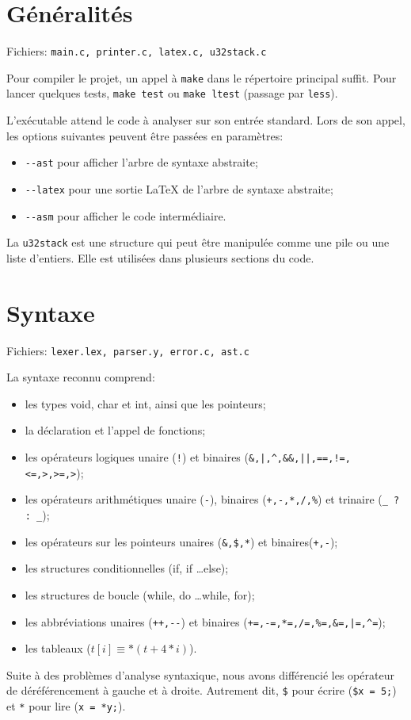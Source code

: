 \documentclass{article}
\begin{document}
	\section{Généralités}
		\par Fichiers: \verb#main.c, printer.c, latex.c, u32stack.c#
		\par Pour compiler le projet, un appel à \verb#make# dans le répertoire principal suffit. Pour lancer quelques tests, \verb#make test# ou \verb#make ltest# (passage par \verb#less#).
		\par L'exécutable attend le code à analyser sur son entrée standard. Lors de son appel, les options suivantes peuvent être passées en paramètres:
		\begin{itemize}
			\item \verb#--ast# pour afficher l'arbre de syntaxe abstraite;
			\item \verb#--latex# pour une sortie LaTeX de l'arbre de syntaxe abstraite;
			\item \verb#--asm# pour afficher le code intermédiaire.
		\end{itemize}
		\par La \verb#u32stack# est une structure qui peut être manipulée comme une pile ou une liste d'entiers. Elle est utilisées dans plusieurs sections du code.
	\section{Syntaxe}
		\par Fichiers: \verb#lexer.lex, parser.y, error.c, ast.c#
		\par La syntaxe reconnu comprend:
		\begin{itemize}
			\item les types void, char et int, ainsi que les pointeurs;
			\item la déclaration et l'appel de fonctions;
			\item les opérateurs logiques unaire (\verb#!#) et binaires (\verb#&,|,^,&&,||,==,!=,<=,>,>=,>#);
			\item les opérateurs arithmétiques unaire (\verb#-#), binaires (\verb#+,-,*,/,%#) et trinaire (\verb#_ ? : _#);
			\item les opérateurs sur les pointeurs unaires (\verb#&,$,*#) et binaires(\verb#+,-#);
			\item les structures conditionnelles (if, if \dots else);
			\item les structures de boucle (while, do \dots while, for);
			\item les abbréviations unaires (\verb#++,--#) et binaires (\verb#+=,-=,*=,/=,%=,&=,|=,^=#);
			\item les tableaux ($t[i] \equiv *(t + 4*i)$).
		\end{itemize}
		\par Suite à des problèmes d'analyse syntaxique, nous avons différencié les opérateur de déréférencement à gauche et à droite. Autrement dit, \verb#$# pour écrire (\verb#$x = 5;#) et \verb#*# pour lire (\verb#x = *y;#).
\end{document}
